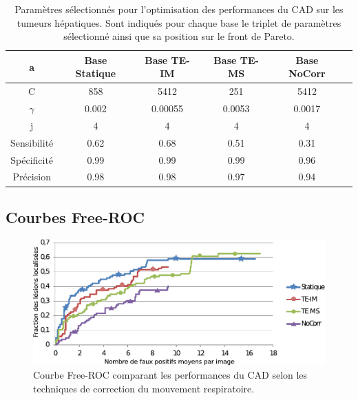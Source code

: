 \begin{table}[h!]
\begin{center}
		\begin{tabular}{c| c c c c c}
  \hline
  a	& Base Statique	& Base TE-IM	& Base TE-MS	& Base NoCorr	\\
  \hline
 C 	& 858		& 5412		& 251		& 5412		\\
\hline
$\gamma$& 0.002		& 0.00055	& 0.0053	& 0.0017	\\
\hline
j	& 4		& 4		& 4		& 4		\\
\hline
\hline
Sensibilité& 0.62	& 0.68		& 0.51		& 0.31	\\
\hline
Spécificité& 0.99	& 0.99		& 0.99		& 0.96		\\
\hline
Précision& 0.98		& 0.98		& 0.97		& 0.94		\\
\hline
 		\end{tabular}

\end{center}
\caption[Paramètres sélectionnés pour l'optimisation des performances du CAD sur les tumeurs hépatiques]{Paramètres sélectionnés pour l'optimisation des performances du CAD sur les tumeurs hépatiques. Sont indiqués pour chaque base le triplet de paramètres sélectionné ainsi que sa position sur le front de Pareto.}
\label{fig:paramsModFoie}
\end{table}

\subsection{Courbes Free-ROC}

\begin{figure}[h!]
 \begin{center}
   \includegraphics[width=15cm]{images/FROC_mod19_corrige}
   \vspace{-0.3cm}
 \end{center}
 \caption{Courbe Free-ROC comparant les performances du CAD selon les techniques de correction du mouvement respiratoire.}
\label{fig:froc_mod19}
\end{figure}


